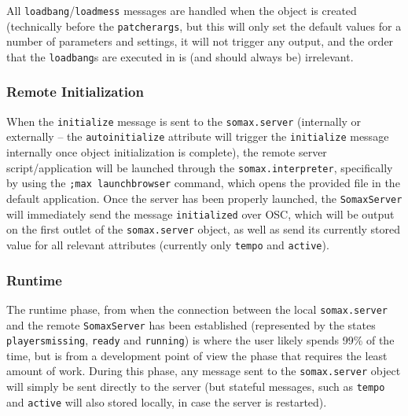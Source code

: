 All \texttt{loadbang}/\texttt{loadmess} messages are handled when the object is created (technically before the \texttt{patcherargs}, but this will only set the default values for a number of parameters and settings, it will not trigger any output, and the order that the \texttt{loadbang}s are executed in is (and should always be) irrelevant.


\subsubsection{Remote Initialization}
When the \texttt{initialize} message is sent to the \texttt{somax.server} (internally or externally – the \texttt{autoinitialize} attribute will trigger the \texttt{initialize} message internally once object initialization is complete), the remote server script/application will be launched through the \texttt{somax.interpreter}, specifically by using the \texttt{;max launchbrowser} command, which opens the provided file in the default application. Once the server has been properly launched, the \texttt{SomaxServer} will immediately send the message \texttt{initialized} over OSC, which will be output on the first outlet of the \texttt{somax.server} object, as well as send its currently stored value for all relevant attributes (currently only \texttt{tempo} and \texttt{active}).


\subsubsection{Runtime}
The runtime phase, from when the connection between the local \texttt{somax.server} and the remote \texttt{SomaxServer} has been established (represented by the states \texttt{playersmissing}, \texttt{ready} and \texttt{running}) is where the user likely spends 99\% of the time, but is from a development point of view the phase that requires the least amount of work. During this phase, any message sent to the \texttt{somax.server} object will simply be sent directly to the server (but stateful messages, such as \texttt{tempo} and \texttt{active} will also stored locally, in case the server is restarted).


